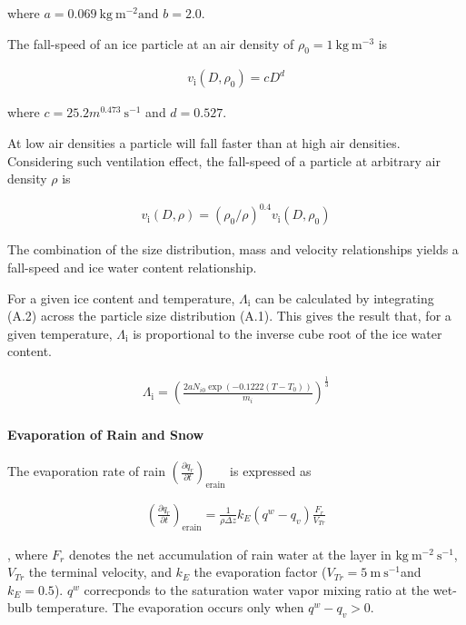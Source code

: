 where \(a=0.069 \mathrm{~kg} \mathrm{~m}^{-2} \text {and } b=2.0\).

The fall-speed of an ice particle at an air density of \(\rho_{0} = 1\mathrm{~kg} \mathrm{~m}^{-3}\) is

\begin{eqnarray}
v_{\text {i}}(D,\rho_0)=c D^{d}
\label{WB99.A3}
\end{eqnarray}

where \(c=25.2 m^{0.473} \mathrm{~s}^{-1}\) and \(d=0.527 .\)

At low air densities a particle will fall faster than at high air densities. Considering such ventilation effect, the fall-speed of a particle at arbitrary air density \(\rho\) is

\begin{eqnarray}
v_{\text {i}}(D,\rho)=\left(\rho_{0} / \rho\right)^{0.4} v_{\text {i}}\left(D,\rho_{0}\right)
\label{WB99.A6}
\end{eqnarray}

The combination of the size distribution, mass and velocity relationships yields a fall-speed and ice water content relationship.

For a given ice content and temperature, \(\Lambda_{\text {i}}\) can be calculated by integrating (A.2) across the particle size distribution (A.1). This gives the result that, for a given
temperature, \(\Lambda_{\text {i}}\) is proportional to the inverse cube root of the ice water content.

\begin{eqnarray}
\Lambda_{\text {i}} = \left(\frac{2aN_{i0}\exp (-0.1222 (T-T_{0}))}{m_i}\right)^{\frac{1}{3}}
\end{eqnarray}

\hypertarget{evaporation-of-rain-and-snow}{%
\paragraph{Evaporation of Rain and Snow}\label{evaporation-of-rain-and-snow}}

The evaporation rate of rain \(\left(\frac{\partial q_r}{\partial t}\right)_{\text {erain}}\) is expressed as

\begin{eqnarray}
\left(\frac{\partial q_r}{\partial t}\right)_{\text {erain}}
=\frac{1}{\rho \Delta z}k_{E}\left(q^{w}-q_v\right) \frac{F_r}{V_{Tr}}
\end{eqnarray}

, where \(F_r\) denotes the net accumulation of rain water at the layer in \(\mathrm{kg} \mathrm{~m}^{-2} \mathrm{~s}^{-1}\), \(V_{Tr}\) the terminal velocity, and \(k_E\) the evaporation factor
(\(V_{Tr} = 5\mathrm{~m} \mathrm{~s}^{-1}\)and \(k_E = 0.5\)). \(q^w\) correcponds to the saturation water vapor mixing ratio at the wet-bulb temperature. The evaporation occurs only when
\(q^{w}-q_v>0\).

